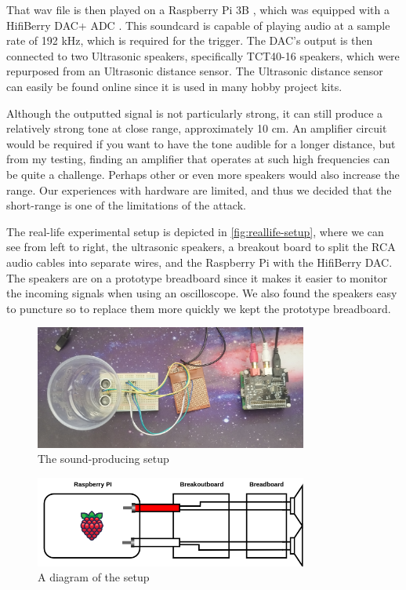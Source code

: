 \documentclass{report}
\theoremstyle{definition}
\theoremstyle{remark}
\begin{document}
That wav file is then played on a Raspberry Pi 3B \cite{RASPBERRY}, which was equipped with a HifiBerry DAC+ ADC \cite{HIFIBERRY}. This soundcard is capable of playing audio at a sample rate of 192 kHz, which is required for the trigger. The DAC's output is then connected to two Ultrasonic speakers, specifically TCT40-16 speakers, which were repurposed from an Ultrasonic distance sensor. The Ultrasonic distance sensor can easily be found online since it is used in many hobby project kits. 

Although the outputted signal is not particularly strong, it can still produce a relatively strong tone at close range, approximately 10 cm. An amplifier circuit would be required if you want to have the tone audible for a longer distance, but from  my testing, finding an amplifier that operates at such high frequencies can be quite a challenge. Perhaps other or even more speakers would also increase the range. Our experiences with hardware are limited, and thus we decided that the short-range is one of the limitations of the attack.

The real-life experimental setup is depicted in \autoref{fig:reallife-setup}, where we can see from left to right, the ultrasonic speakers, a breakout board to split the RCA audio cables into separate wires, and the Raspberry Pi with the HifiBerry DAC. The speakers are on a prototype breadboard since it makes it easier to monitor the incoming signals when using an oscilloscope. We also found the speakers easy to puncture so to replace them more quickly we kept the prototype breadboard.

\begin{figure}[!hbt]
    \centering
    \includegraphics[width=0.8\textwidth]{img/setup.jpg}
    \caption{The sound-producing setup}
    \label{fig:reallife-setup}
\end{figure}

\begin{figure}[!hbt]
    \centering
    \includegraphics[width=0.8\textwidth]{img/diagram.png}
    \caption{A diagram of the setup}
    \label{fig:diagram-setup}
\end{figure}
\end{document}
